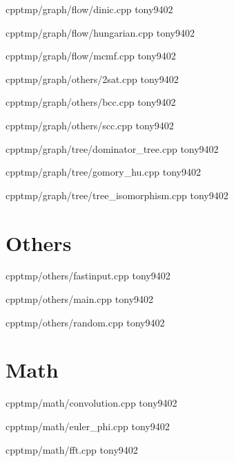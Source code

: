 {}
{}
{}
{cpp}{tmp/graph/flow/dinic.cpp}
{tony9402}



{}
{}
{}
{cpp}{tmp/graph/flow/hungarian.cpp}
{tony9402}



{}
{}
{}
{cpp}{tmp/graph/flow/mcmf.cpp}
{tony9402}



{}
{}
{}
{cpp}{tmp/graph/others/2sat.cpp}
{tony9402}



{}
{}
{}
{cpp}{tmp/graph/others/bcc.cpp}
{tony9402}



{}
{}
{}
{cpp}{tmp/graph/others/scc.cpp}
{tony9402}



{}
{}
{}
{cpp}{tmp/graph/tree/dominator_tree.cpp}
{tony9402}



{}
{}
{}
{cpp}{tmp/graph/tree/gomory_hu.cpp}
{tony9402}



{}
{}
{}
{cpp}{tmp/graph/tree/tree_isomorphism.cpp}
{tony9402}


\section{Others}


{}
{}
{}
{cpp}{tmp/others/fastinput.cpp}
{tony9402}



{}
{}
{}
{cpp}{tmp/others/main.cpp}
{tony9402}



{}
{}
{}
{cpp}{tmp/others/random.cpp}
{tony9402}


\section{Math}


{}
{}
{}
{cpp}{tmp/math/convolution.cpp}
{tony9402}



{}
{}
{}
{cpp}{tmp/math/euler_phi.cpp}
{tony9402}



{}
{}
{}
{cpp}{tmp/math/fft.cpp}
{tony9402}



